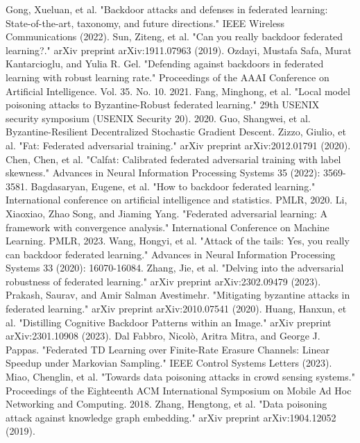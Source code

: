 \documentclass[conference]{IEEEtran}
\begin{document}
\begin{thebibliography}{00}
     Gong, Xueluan, et al. "Backdoor attacks and defenses in federated learning: State-of-the-art, taxonomy, and future directions." IEEE Wireless Communications (2022).
     Sun, Ziteng, et al. "Can you really backdoor federated learning?." arXiv preprint arXiv:1911.07963 (2019).
     Ozdayi, Mustafa Safa, Murat Kantarcioglu, and Yulia R. Gel. "Defending against backdoors in federated learning with robust learning rate." Proceedings of the AAAI Conference on Artificial Intelligence. Vol. 35. No. 10. 2021.
     Fang, Minghong, et al. "Local model poisoning attacks to {Byzantine-Robust} federated learning." 29th USENIX security symposium (USENIX Security 20). 2020.
     Guo, Shangwei, et al. Byzantine-Resilient Decentralized Stochastic Gradient Descent.
     Zizzo, Giulio, et al. "Fat: Federated adversarial training." arXiv preprint arXiv:2012.01791 (2020).
     Chen, Chen, et al. "Calfat: Calibrated federated adversarial training with label skewness." Advances in Neural Information Processing Systems 35 (2022): 3569-3581.
     Bagdasaryan, Eugene, et al. "How to backdoor federated learning." International conference on artificial intelligence and statistics. PMLR, 2020.
     Li, Xiaoxiao, Zhao Song, and Jiaming Yang. "Federated adversarial learning: A framework with convergence analysis." International Conference on Machine Learning. PMLR, 2023.
     Wang, Hongyi, et al. "Attack of the tails: Yes, you really can backdoor federated learning." Advances in Neural Information Processing Systems 33 (2020): 16070-16084.
     Zhang, Jie, et al. "Delving into the adversarial robustness of federated learning." arXiv preprint arXiv:2302.09479 (2023).
     Prakash, Saurav, and Amir Salman Avestimehr. "Mitigating byzantine attacks in federated learning." arXiv preprint arXiv:2010.07541 (2020).
     Huang, Hanxun, et al. "Distilling Cognitive Backdoor Patterns within an Image." arXiv preprint arXiv:2301.10908 (2023).
     Dal Fabbro, Nicolò, Aritra Mitra, and George J. Pappas. "Federated TD Learning over Finite-Rate Erasure Channels: Linear Speedup under Markovian Sampling." IEEE Control Systems Letters (2023).
     Miao, Chenglin, et al. "Towards data poisoning attacks in crowd sensing systems." Proceedings of the Eighteenth ACM International Symposium on Mobile Ad Hoc Networking and Computing. 2018.
     Zhang, Hengtong, et al. "Data poisoning attack against knowledge graph embedding." arXiv preprint arXiv:1904.12052 (2019).

\end{thebibliography}
\end{document}
